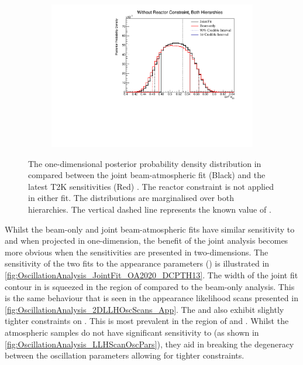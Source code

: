 \begin{figure}[h]
  \begin{subfigure}[t]{0.98\textwidth}
    \includegraphics[width=\textwidth, trim={0mm 0mm 0mm 0mm}, clip,page=1]{Figures/OA/JointFit_OA2020_Comp/ContourComparison_1D_th23_BH_2_woRC_UnSmeared_CredibleInterval.pdf}
  \end{subfigure}
  \caption{The one-dimensional posterior probability density distribution in  compared between the joint beam-atmospheric fit (Black) and the latest T2K sensitivities (Red) \cite{Dunne2020-uf, t2k_tn_393}. The reactor constraint is not applied in either fit. The distributions are marginalised over both hierarchies. The vertical dashed line represents the known value of .}
  \label{fig:OscillationAnalysis_JointFit_OA2020_TH23}
\end{figure}

Whilst the beam-only and joint beam-atmospheric fits have similar sensitivity to  and  when projected in one-dimension, the benefit of the joint analysis becomes more obvious when the sensitivities are presented in two-dimensions. The sensitivity of the two fits to the appearance parameters () is illustrated in \autoref{fig:OscillationAnalysis_JointFit_OA2020_DCPTH13}. The width of the  joint fit contour in  is squeezed in the region of  compared to the beam-only analysis. This is the same behaviour that is seen in the appearance likelihood scans presented in \autoref{fig:OscillationAnalysis_2DLLHOscScans_App}. The \quickmath{1\sigma} and  also exhibit slightly tighter constraints on . This is most prevalent in the region of  and . Whilst the atmospheric samples do not have significant sensitivity to  (as shown in \autoref{fig:OscillationAnalysis_LLHScanOscPars}), they aid in breaking the degeneracy between the oscillation parameters allowing for tighter constraints.

